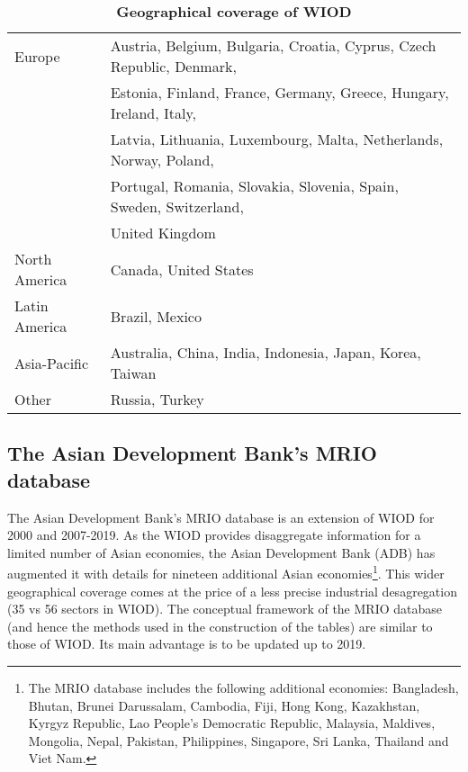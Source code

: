 \documentclass[11pt,a4paper]{paper} %
\begin{document}
 
\begin{table}[!h]
\begin{threeparttable}
\centering
\centering
\caption{\small{\textbf{Geographical coverage of WIOD}}}
\small
\begin{tabular}{ll}
\hline\hline
Europe & Austria, Belgium, Bulgaria, Croatia, Cyprus, Czech Republic, Denmark,\\
& Estonia, Finland, France, Germany, Greece, Hungary, Ireland, Italy,\\
& Latvia, Lithuania, Luxembourg, Malta, Netherlands, Norway, Poland,\\
&Portugal, Romania, Slovakia, Slovenia, Spain, Sweden, Switzerland,\\
& United Kingdom\\
North  America& Canada, United States\\
Latin America & Brazil, Mexico \\
Asia-Pacific & Australia, China, India, Indonesia, Japan, Korea, Taiwan\\
Other & Russia, Turkey\\
\hline\hline
\end{tabular} 
\label{tab:wiod}
\end{threeparttable}
\end{table} 

\subsection{The Asian Development Bank's MRIO database} 
The Asian Development Bank's MRIO database is an extension of WIOD for 2000 and 2007-2019.
As the WIOD provides disaggregate information for a limited number of Asian economies, the Asian Development Bank (ADB) has augmented it with details for nineteen additional Asian economies\footnote{The MRIO database includes the following additional economies: Bangladesh, Bhutan, Brunei Darussalam, Cambodia, Fiji, Hong Kong, Kazakhstan, Kyrgyz Republic, Lao People’s Democratic Republic, Malaysia, Maldives, Mongolia, Nepal, Pakistan, Philippines, Singapore, Sri Lanka, Thailand and Viet Nam.}. 
This wider geographical coverage comes at the price of a less precise industrial desagregation (35 vs 56 sectors in WIOD).
The conceptual framework of the MRIO database (and hence the methods used in the construction of the tables) are similar to those of WIOD.
Its main advantage is to be updated up to 2019.  
\end{document}
